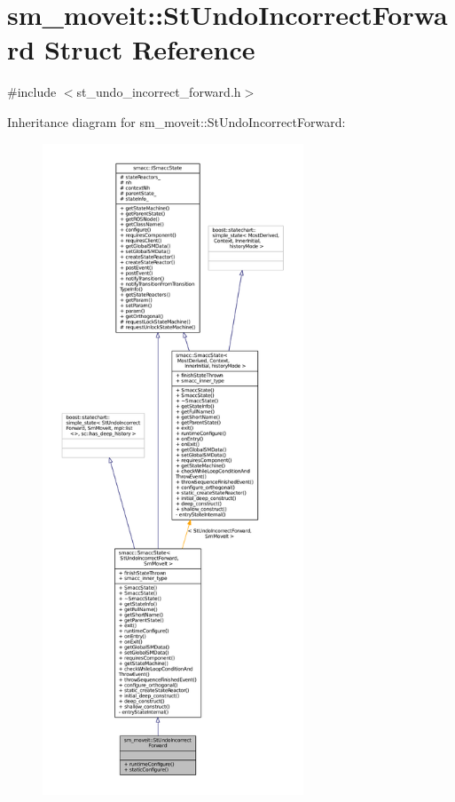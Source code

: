 \hypertarget{structsm__moveit_1_1StUndoIncorrectForward}{}\section{sm\+\_\+moveit\+:\+:St\+Undo\+Incorrect\+Forward Struct Reference}
\label{structsm__moveit_1_1StUndoIncorrectForward}


{\ttfamily \#include $<$st\+\_\+undo\+\_\+incorrect\+\_\+forward.\+h$>$}



Inheritance diagram for sm\+\_\+moveit\+:\+:St\+Undo\+Incorrect\+Forward\+:
\nopagebreak
\begin{figure}[H]
\begin{center}
\leavevmode
\includegraphics[height=550pt]{structsm__moveit_1_1StUndoIncorrectForward__inherit__graph}
\end{center}
\end{figure}


